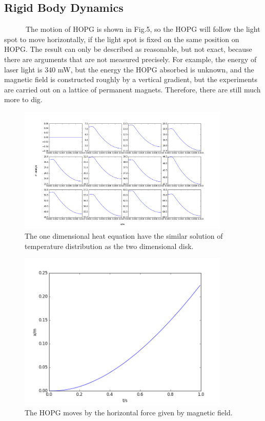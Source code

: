 \documentclass[a4paper,11pt]{article}
\theoremstyle{mytheor}
\begin{document}
\subsection*{Rigid Body Dynamics}
\ \ \ \ \ \ The motion of HOPG is shown in Fig.5, so the HOPG will follow the light spot to move horizontally, if the light spot is fixed on the same position on HOPG. The result can only be described as reasonable, but not exact, because there are arguments that are not measured precisely. For example, the energy of laser light is 340 mW, but the energy the HOPG absorbed is unknown, and the magnetic field is constructed roughly by a vertical gradient, but the experiments are carried out on a lattice of permanent magnets. Therefore, there are still much more to dig.

\clearpage

\begin{figure}[!htb]
\centering
\includegraphics[width=0.9\textwidth]{figure_4.png}
\caption{The one dimensional heat equation have the similar solution of temperature distribution as the two dimensional disk.}
\end{figure}
\begin{figure}[!htb]
\centering
\includegraphics[width=0.9\textwidth]{figure_5.png}
\caption{The HOPG moves by the horizontal force given by magnetic field.}
\end{figure}
\end{document}
